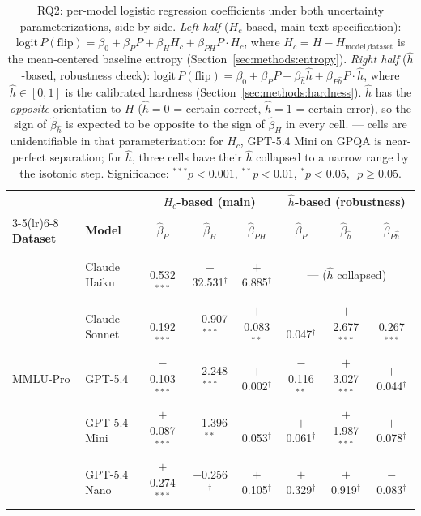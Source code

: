 \begin{table}[t]
\centering
\caption{RQ2: per-model logistic regression coefficients under both
  uncertainty parameterizations, side by side.
  \emph{Left half} ($H_c$-based, main-text specification):
  $\mathrm{logit}\,P(\mathrm{flip}) =
   \beta_0 + \beta_P P + \beta_H H_c + \beta_{PH} P\!\cdot\!H_c$,
  where $H_c = H - \bar{H}_{\text{model,dataset}}$ is the mean-centered
  baseline entropy (Section~\ref{sec:methods:entropy}).
  \emph{Right half} ($\hat h$-based, robustness check):
  $\mathrm{logit}\,P(\mathrm{flip}) =
   \beta_0 + \beta_P P + \beta_{\hat h} \hat h + \beta_{P\hat h} P\!\cdot\!\hat h$,
  where $\hat h \in [0, 1]$ is the calibrated hardness
  (Section~\ref{sec:methods:hardness}).
  $\hat h$ has the \emph{opposite} orientation to $H$
  ($\hat h {=} 0$ = certain-correct, $\hat h {=} 1$ = certain-error),
  so the sign of $\hat\beta_{\hat h}$ is expected to be
  opposite to the sign of $\hat\beta_H$ in every cell.
  --- cells are unidentifiable in that parameterization: for $H_c$,
  GPT-5.4 Mini on GPQA is near-perfect separation; for $\hat h$, three
  cells have their $\hat h$ collapsed to a narrow range by the
  isotonic step.
  Significance: $^{***}p{<}0.001$, $^{**}p{<}0.01$, $^{*}p{<}0.05$,
  $^\dagger p{\geq}0.05$.}
\label{tab:rq2_combined}
\small
\setlength{\tabcolsep}{4pt}
\begin{tabular}{ll ccc ccc}
\toprule
 & & \multicolumn{3}{c}{\textbf{$H_c$-based (main)}} & \multicolumn{3}{c}{\textbf{$\hat h$-based (robustness)}} \\
\cmidrule(lr){3-5}\cmidrule(lr){6-8}
\textbf{Dataset} & \textbf{Model} & $\hat\beta_P$ & $\hat\beta_H$ & $\hat\beta_{PH}$ & $\hat\beta_P$ & $\hat\beta_{\hat h}$ & $\hat\beta_{P\hat h}$ \\
\midrule
\multirow{5}{*}{MMLU-Pro}
  & Claude Haiku  & $-$0.532$^{***}$ & $-$32.531$^\dagger$   & $+$6.885$^\dagger$  & \multicolumn{3}{c}{--- \tiny{($\hat h$ collapsed)}} \\
  & Claude Sonnet & $-$0.192$^{***}$ & $-$0.907$^{***}$      & $+$0.083$^{**}$     & $-$0.047$^\dagger$ & $+$2.677$^{***}$ & $-$0.267$^{***}$ \\
  & GPT-5.4       & $-$0.103$^{***}$ & $-$2.248$^{***}$      & $+$0.002$^\dagger$  & $-$0.116$^{**}$    & $+$3.027$^{***}$ & $+$0.044$^\dagger$ \\
  & GPT-5.4 Mini  & $+$0.087$^{***}$ & $-$1.396$^{**}$       & $-$0.053$^\dagger$  & $+$0.061$^\dagger$ & $+$1.987$^{***}$ & $+$0.078$^\dagger$ \\
  & GPT-5.4 Nano  & $+$0.274$^{***}$ & $-$0.256$^\dagger$    & $+$0.105$^\dagger$  & $+$0.329$^\dagger$ & $+$0.919$^\dagger$ & $-$0.083$^\dagger$ \\

\end{tabular}
\end{table}

